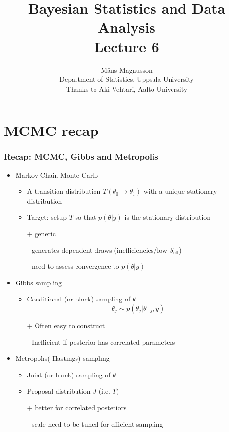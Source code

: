 \documentclass[10pt]{beamer}
\title[]{{\color{black}Bayesian Statistics and Data Analysis \\ Lecture 6}}
\author[]{M{\aa}ns Magnusson \\ Department of Statistics, Uppsala University \\ Thanks to Aki Vehtari, Aalto University}
\date{}
\newcommand{\uured}[1]{\textcolor{uured}{#1}}
\begin{document}
\frame{\titlepage
}



\section{MCMC recap}

\begin{frame}
\frametitle{Recap: MCMC, Gibbs and Metropolis}

\begin{itemize}
\item Markov Chain Monte Carlo
\begin{itemize}
\item A \uured{transition distribution} $T(\theta_0 \rightarrow \theta_1)$ with a unique \uured{stationary distribution}
\item Target: setup $T$ so that $p(\theta|y)$ is the stationary distribution\pause
\item [+] generic \pause
\item [-] generates dependent draws (inefficiencies/low $S_\text{eff}$)
\item [-] need to assess convergence to $p(\theta|y)$
\end{itemize}
\pause
\item Gibbs sampling
\begin{itemize}
\item Conditional (or block) sampling of $\theta$
\[
\theta_j \sim p(\theta_j|\theta_{-j}, y)
\]
\pause
\item[+] Often easy to construct \pause
\item[-] Inefficient if posterior has correlated parameters
\end{itemize}
\pause
\item Metropolis(-Hastings) sampling
\begin{itemize}
\item Joint (or block) sampling of $\theta$
\item Proposal distribution $J$ (i.e. $T$)\pause
\item[+] better for correlated posteriors\pause
\item[-] scale need to be tuned for efficient sampling
\end{itemize}
\end{itemize}

\end{frame}
\end{document}
